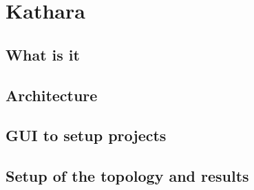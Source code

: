 
\chapter{Kathara}
\label{ch:kathara}

\section{What is it}
\label{sec:katharawhatis}

\section{Architecture}
\label{sec:katharaarchitecture}

\section{GUI to setup projects}
\label{sec:katharagui}

\section{Setup of the topology and results}
\label{sec:katharatopologyexample}

